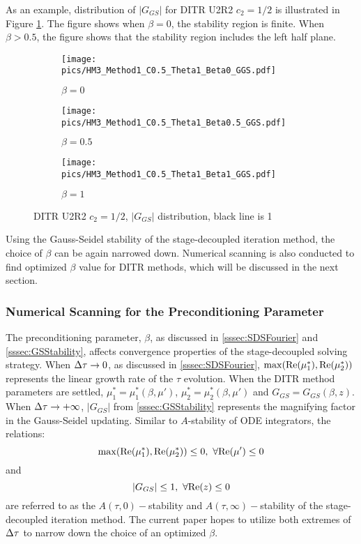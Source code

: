 \documentclass[preprint,12pt]{elsarticle}
\begin{document}
As an example, distribution of $|G_{GS}|$ for DITR U2R2 $c_2=1/2$
is illustrated in Figure \ref{fig:GGSU2R2}.
The figure shows when $\beta=0$, the stability region is finite.
When $\beta>0.5$, the figure shows that the stability region includes
the left half plane.
\begin{figure}[htbp]
    \centering
    \begin{subfigure}{0.33\textwidth}
        \texttt{[image: pics/HM3\_Method1\_C0.5\_Theta1\_Beta0\_GGS.pdf]}
        \caption[]{$\beta = 0$}
    \end{subfigure}\hfill
    \begin{subfigure}{0.33\textwidth}
        \texttt{[image: pics/HM3\_Method1\_C0.5\_Theta1\_Beta0.5\_GGS.pdf]}
        \caption[]{$\beta = 0.5$}
    \end{subfigure}\hfill
    \begin{subfigure}{0.33\textwidth}
        \texttt{[image: pics/HM3\_Method1\_C0.5\_Theta1\_Beta1\_GGS.pdf]}
        \caption[]{$\beta = 1$}
    \end{subfigure}
    \caption{DITR U2R2 $c_2=1/2$, $|G_{GS}|$ distribution, black line is 1}
    \label{fig:GGSU2R2}
\end{figure}

Using the Gauss-Seidel stability of the stage-decoupled iteration method,
the choice of $\beta$ can be again narrowed down.
Numerical scanning is also conducted to find optimized $\beta$ value for
DITR methods, which will be discussed in the next section.

\subsubsection{Numerical Scanning for the Preconditioning Parameter}
\label{sssec:numScan}

The preconditioning parameter, $\beta$, as discussed in \ref{sssec:SDSFourier}
and \ref{sssec:GSStability}, affects convergence properties of the
stage-decoupled solving strategy.
When $\mathrm\Delta \tau\rightarrow0$, as discussed in \ref{sssec:SDSFourier},
$\max(\mathrm{Re}(\mu^*_1),\mathrm{Re}(\mu^*_2))$ represents the linear growth
rate of the $\tau$ evolution. When the DITR method parameters are settled,
$\mu^*_1=\mu^*_1(\beta, \mu')$, $\mu^*_2=\mu^*_2(\beta, \mu')$ and $G_{GS}=G_{GS}(\beta, z)$.
When $\mathrm\Delta \tau\rightarrow+\infty$, $|G_{GS}|$ from \ref{sssec:GSStability}
represents the magnifying factor in the Gauss-Seidel updating.
Similar to $A$-stability of ODE integrators,
the relations:
\begin{equation}
    \max(\real(\mu^*_1),\real(\mu^*_2)) \leq 0,\ \forall \real(\mu') \leq 0
\end{equation}
and
\begin{equation}
    |G_{GS}| \leq 1,\ \forall \mathrm{Re}(z) \leq 0
\end{equation}
are referred to as the $A(\tau,0)-$stability and
$A(\tau,\infty)-$stability
of the stage-decoupled iteration method.
The current paper hopes to utilize both extremes of $\mathrm\Delta\tau$ to
narrow down the choice of an optimized $\beta$.
\end{document}
